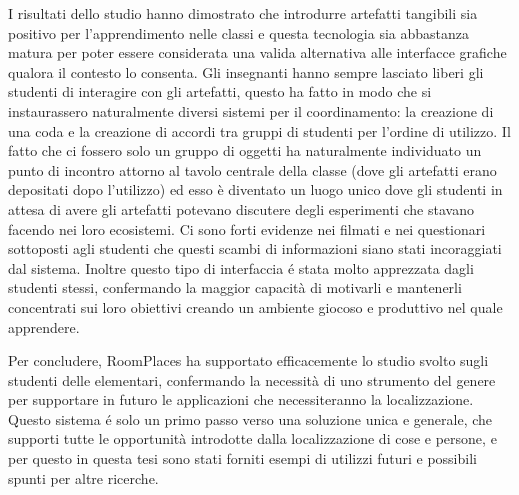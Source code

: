 I risultati dello studio hanno dimostrato che introdurre artefatti tangibili sia positivo per l’apprendimento nelle classi e questa tecnologia sia abbastanza matura per poter essere considerata una valida alternativa alle interfacce grafiche qualora il contesto lo consenta. Gli insegnanti hanno sempre lasciato liberi gli studenti di interagire con gli artefatti, questo ha fatto in modo che si instaurassero naturalmente diversi sistemi per il coordinamento: la creazione di una coda e la creazione di accordi tra gruppi di studenti per l’ordine di utilizzo. Il fatto che ci fossero solo un gruppo di oggetti ha naturalmente individuato un punto di incontro attorno al tavolo centrale della classe (dove gli artefatti erano depositati dopo l’utilizzo) ed esso è diventato un luogo unico dove gli studenti in attesa di avere gli artefatti potevano discutere degli esperimenti che stavano facendo nei loro ecosistemi. Ci sono forti evidenze nei filmati e nei questionari sottoposti agli studenti che questi scambi di informazioni siano stati incoraggiati dal sistema. Inoltre questo tipo di interfaccia é stata molto apprezzata dagli studenti stessi, confermando la maggior capacità di motivarli e mantenerli concentrati sui loro obiettivi creando un ambiente giocoso e produttivo nel quale apprendere.

Per concludere, RoomPlaces ha supportato efficacemente lo studio svolto sugli studenti delle elementari, confermando la necessità di uno strumento del genere per supportare in futuro le applicazioni che necessiteranno la localizzazione. Questo sistema é solo un primo passo verso una soluzione unica e generale, che supporti tutte le opportunità introdotte dalla localizzazione di cose e persone, e per questo in questa tesi sono stati forniti esempi di utilizzi futuri e possibili spunti per altre ricerche.

